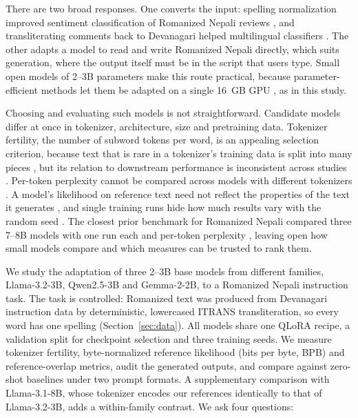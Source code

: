 \documentclass{article}
\begin{document}
There are two broad responses. One converts the input: spelling normalization improved sentiment classification of Romanized Nepali reviews \citep{chaudhary2025}, and transliterating comments back to Devanagari helped multilingual classifiers \citep{patel2026}. The other adapts a model to read and write Romanized Nepali directly, which suits generation, where the output itself must be in the script that users type. Small open models of 2–3B parameters make this route practical, because parameter-efficient methods let them be adapted on a single 16~GB GPU \citep{dettmers2023}, as in this study.

Choosing and evaluating such models is not straightforward. Candidate models differ at once in tokenizer, architecture, size and pretraining data. Tokenizer fertility, the number of subword tokens per word, is an appealing selection criterion, because text that is rare in a tokenizer's training data is split into many pieces \citep{rust2021,petrov2023}, but its relation to downstream performance is inconsistent across studies \citep{ali2024,goldman2024,schmidt2024}. Per-token perplexity cannot be compared across models with different tokenizers \citep{gao2020}. A model's likelihood on reference text need not reflect the properties of the text it generates \citep{meister2021}, and single training runs hide how much results vary with the random seed \citep{dodge2020}. The closest prior benchmark for Romanized Nepali compared three 7–8B models with one run each and per-token perplexity \citep{rimal2026}, leaving open how small models compare and which measures can be trusted to rank them.

We study the adaptation of three 2–3B base models from different families, Llama-3.2-3B, Qwen2.5-3B and Gemma-2-2B, to a Romanized Nepali instruction task. The task is controlled: Romanized text was produced from Devanagari instruction data by deterministic, lowercased ITRANS transliteration, so every word has one spelling (Section~\ref{sec:data}). All models share one QLoRA recipe, a validation split for checkpoint selection and three training seeds. We measure tokenizer fertility, byte-normalized reference likelihood (bits per byte, BPB) and reference-overlap metrics, audit the generated outputs, and compare against zero-shot baselines under two prompt formats. A supplementary comparison with Llama-3.1-8B, whose tokenizer encodes our references identically to that of Llama-3.2-3B, adds a within-family contrast. We ask four questions:
\end{document}
